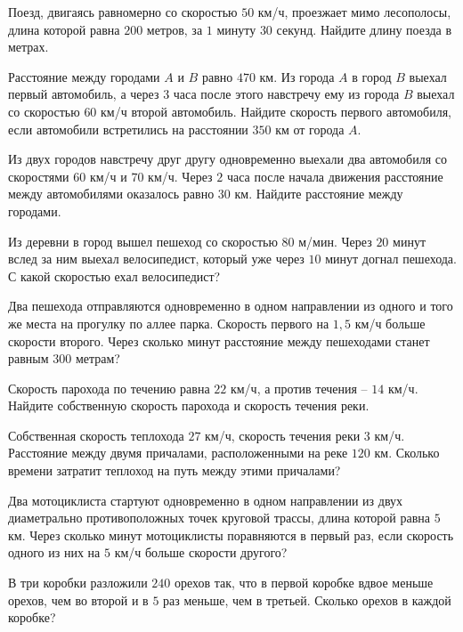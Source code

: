\begin{class}[number=7]
	\begin{listofex}
		\item Поезд, двигаясь равномерно со скоростью \( 50 \) км/ч, проезжает мимо лесополосы, длина 
		которой равна \( 200 \) метров, за \( 1 \) минуту \( 30 \) секунд. Найдите длину поезда в метрах.
		\item Расстояние между городами \( A \) и \( B \) равно \( 470 \) км. Из города \( A \) в город \( B \) выехал первый автомобиль, а через \( 3 \) часа после этого навстречу ему из города \( B \) выехал со скоростью \( 60 \) км/ч второй автомобиль. Найдите скорость первого автомобиля, если автомобили встретились на расстоянии \( 350 \) км от города \( A \).
		\item Из двух городов навстречу друг другу одновременно выехали два автомобиля со скоростями \( 60 \) км/ч и \( 70 \) км/ч. Через \( 2 \) часа после начала движения расстояние между автомобилями оказалось равно \( 30 \) км. Найдите расстояние между городами.
		\item Из деревни в город вышел пешеход со скоростью \( 80 \) м/мин. Через \( 20 \) минут вслед за ним выехал велосипедист, который уже через \( 10 \) минут догнал пешехода. С какой скоростью ехал велосипедист?
		\item Два пешехода отправляются одновременно в одном направлении из одного и того же места на прогулку по аллее парка. Скорость первого на \( 1,5 \) км/ч больше скорости второго. Через сколько минут расстояние между пешеходами станет равным \( 300 \) метрам?
		\item Скорость парохода по течению равна \( 22 \) км/ч, а против течения – \( 14 \) км/ч. Найдите собственную скорость парохода и скорость течения реки.
		\item Собственная скорость теплохода \( 27 \) км/ч, скорость течения реки \( 3 \) км/ч. Расстояние между двумя причалами, расположенными на реке \( 120 \) км. Сколько времени затратит теплоход на путь между этими причалами? 
		\item Два мотоциклиста стартуют одновременно в одном направлении из двух диаметрально противоположных точек круговой трассы, длина которой равна \( 5 \) км. Через сколько минут мотоциклисты поравняются в первый раз, если скорость одного из них на \( 5  \) км/ч больше скорости другого?
		\item В три коробки разложили \( 240 \) орехов так, что в первой коробке вдвое меньше орехов, чем во второй и в \( 5 \) раз меньше, чем в третьей. Сколько орехов в каждой коробке?

\end{listofex}
\end{class}
